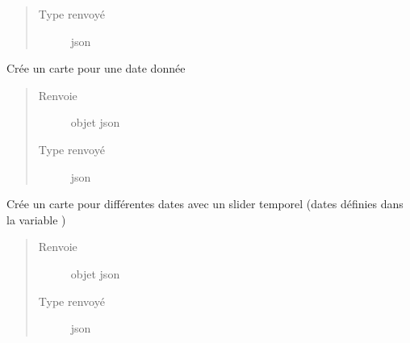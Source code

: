 \documentclass[letterpaper,10pt,french]{sphinxmanual}
\begin{document}
\begin{fulllineitems}
\begin{fulllineitems}
\begin{quote}
\begin{description}
\item[{Type renvoyé}] \leavevmode
\sphinxAtStartPar
json

\end{description}\end{quote}

\end{fulllineitems}


\begin{fulllineitems}
\label{\detokenize{app.home.content_gen:app.home.content_gen.map_generation.FirePlot.plot_at_date}}
\sphinxAtStartPar
Crée un carte pour une date donnée
\begin{quote}\begin{description}
\item[{Renvoie}] \leavevmode
\sphinxAtStartPar
objet json

\item[{Type renvoyé}] \leavevmode
\sphinxAtStartPar
json

\end{description}\end{quote}

\end{fulllineitems}


\begin{fulllineitems}
\label{\detokenize{app.home.content_gen:app.home.content_gen.map_generation.FirePlot.plot_cursor}}
\sphinxAtStartPar
Crée un carte pour différentes dates avec un slider temporel
(dates définies dans la variable )
\begin{quote}\begin{description}
\item[{Renvoie}] \leavevmode
\sphinxAtStartPar
objet json

\item[{Type renvoyé}] \leavevmode
\sphinxAtStartPar
json

\end{description}\end{quote}


\end{fulllineitems}
\end{fulllineitems}
\end{document}
